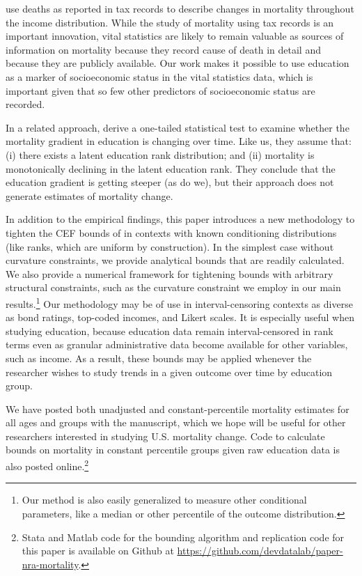 \documentclass[12pt,letterpaper]{article}
\numberwithin{equation}{section}
\begin{document}
\citet{Chetty2016b} use deaths as reported in tax records to describe changes in mortality throughout the income distribution. While the study of mortality using tax records is an important innovation, vital statistics are likely to remain valuable as sources of information on mortality because they record cause of death in detail and because they are publicly available. Our work makes it possible to use education as a marker of socioeconomic status in the vital statistics data, which is important given that so few other predictors of socioeconomic status are recorded.

In a related approach, \citet{Goldring2016} derive a one-tailed statistical test to examine whether the mortality gradient in education is changing over time. Like us, they assume that: (i) there exists a latent education rank distribution; and (ii) mortality is monotonically declining in the latent education rank. They conclude that the education gradient is getting steeper (as do we), but their approach does not generate estimates of mortality change. 

In addition to the empirical findings, this paper introduces a new
methodology to tighten the CEF bounds of \citet{Manski2002} in
contexts with known conditioning distributions (like ranks, which are
uniform by construction). In the simplest case without curvature
constraints, we provide analytical bounds that are readily
calculated. We also provide a numerical framework for tightening
bounds with arbitrary structural constraints, such as the curvature
constraint we employ in our main results.\footnote{Our method is also
  easily generalized to measure other conditional parameters, like a
  median or other percentile of the outcome distribution.} Our
methodology may be of use in interval-censoring contexts as diverse as
bond ratings, top-coded incomes, and Likert scales. It is especially
useful when studying education, because education data remain
interval-censored in rank terms even as granular administrative data
become available for other variables, such as income. As a result,
these bounds may be applied whenever the researcher wishes to study
trends in a given outcome over time by education group.

We have posted both unadjusted and constant-percentile mortality estimates for all ages and groups with the manuscript, which we hope will be useful for other researchers interested in studying U.S. mortality change. Code to calculate bounds on mortality in constant percentile groups given raw education data is also posted online.\footnote{Stata and Matlab code for the bounding algorithm and replication code for this paper is available on Github at \url{https://github.com/devdatalab/paper-nra-mortality}.}
\end{document}
